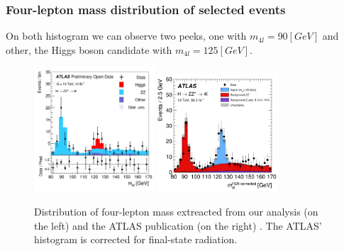 \documentclass[aspectratio=1610, english]{beamer}
\begin{document}
\begin{frame}
\frametitle{Four-lepton mass distribution of selected events}

On both histogram we can observe two peeks, one with $m_{4l} = 90 [GeV]$ and other, the Higgs boson candidate with $m_{4l} = 125 [GeV]$.

\begin{figure} [H]
\centering
\includegraphics[width=0.4\textwidth]{mass_four_lep.png}
\includegraphics[width=0.4\textwidth]{mass_four_lep_pub.png}
\caption{ Distribution of four-lepton mass extreacted from our analysis (on the left) and the ATLAS publication (on the right) \cite{hzz}. The ATLAS' histogram is corrected for final-state radiation.}
\end{figure}

\end{frame}
\end{document}
